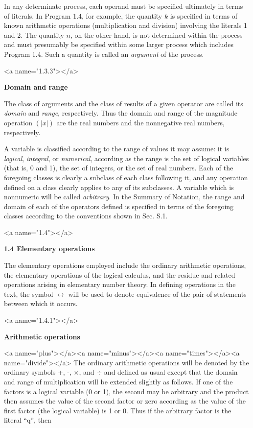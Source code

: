 \par In any determinate process, each operand must be specified ultimately in terms of literals. In Program 1.4, for example, the quantity $k$ is specified in terms of known arithmetic operations (multiplication and division) involving the literals 1 and 2. The quantity $n$, on the other hand, is not determined within the process and must presumably be specified within some larger process which includes Program 1.4. Such a quantity is called an \textit{argument} of the process.

<a name="1.3.3"></a>
\par \textbf{Domain and range}

\par The class of arguments and the class of results of a given operator are called its \textit{domain} and \textit{range}, respectively. Thus the domain and range of the magnitude operation $(|x|)$ are the real numbers and the nonnegative real numbers, respectively.

\par A variable is classified according to the range of values it may assume: it is \textit{logical}, \textit{integral}, or \textit{numerical}, according as the range is the set of logical variables (that is, 0 and 1), the set of integers, or the set of real numbers. Each of the foregoing classes is clearly a subclass of each class following it, and any operation defined on a class clearly applies to any of its subclasses. A variable which is nonnumeric will be called \textit{arbitrary}. In the Summary of Notation, the range and domain of each of the operators defined is specified in terms of the foregoing classes according to the conventions shown in Sec. S.1.

<a name="1.4"></a>
\par \textbf{1.4 Elementary operations}

\par The elementary operations employed include the ordinary arithmetic operations, the elementary operations of the logical calculus, and the residue and related operations arising in elementary number theory. In defining operations in the text, the symbol $\leftrightarrow$ will be used to denote equivalence of the pair of statements between which it occurs.

<a name="1.4.1"></a>
\par \textbf{Arithmetic operations}

<a name="plus"></a><a name="minus"></a><a name="times"></a><a name="divide"></a> The ordinary arithmetic operations will be denoted by the ordinary symbols +, -, $\times$, and $÷$ and defined as usual except that the domain and range of multiplication will be extended slightly as follows. If one of the factors is a logical variable (0 or 1), the second may be arbitrary and the product then assumes the value of the second factor or zero according as the value of the first factor (the logical variable) is 1 or 0. Thus if the arbitrary factor is the literal ``q'', then

